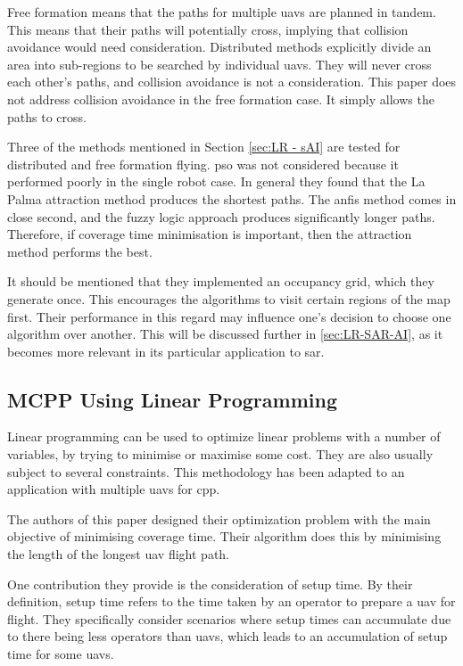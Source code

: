 Free formation means that the paths for multiple \acp{uav} are planned in tandem. This means that their paths will potentially cross, implying that collision avoidance would need consideration. Distributed methods explicitly divide an area into sub-regions to be searched by individual \acp{uav}. They will never cross each other's paths, and collision avoidance is not a consideration. This paper does not address collision avoidance in the free formation case. It simply allows the paths to cross.

Three of the methods mentioned in Section \ref{sec:LR - sAI} are tested for distributed and free formation flying. \ac{pso} was not considered because it performed poorly in the single robot case. In general they found that the La Palma attraction method produces the shortest paths. The \ac{anfis} method comes in close second, and the fuzzy logic approach produces significantly longer paths. Therefore, if coverage time minimisation is important, then the attraction method performs the best.

It should be mentioned that they implemented an occupancy grid, which they generate once. This encourages the algorithms to visit certain regions of the map first. Their performance in this regard may influence one's decision to choose one algorithm over another. This will be discussed further in \ref{sec:LR-SAR-AI}, as it becomes more relevant in its particular application to \ac{sar}.
\subsection{MCPP Using Linear Programming}
Linear programming can be used to optimize linear problems with a number of variables, by trying to minimise or maximise some cost. They are also usually subject to several constraints. This methodology has been adapted to an application with multiple \acp{uav} for \ac{cpp}. \cite{Avellar2015}

The authors of this paper designed their optimization problem with the main objective of minimising coverage time. Their algorithm does this by minimising the length of the longest \ac{uav} flight path. 

One contribution they provide is the consideration of setup time. By their definition, setup time refers to the time taken by an operator to prepare a \ac{uav} for flight. They specifically consider scenarios where setup times can accumulate due to there being less operators than \acp{uav}, which leads to an accumulation of setup time for some \acp{uav}.

